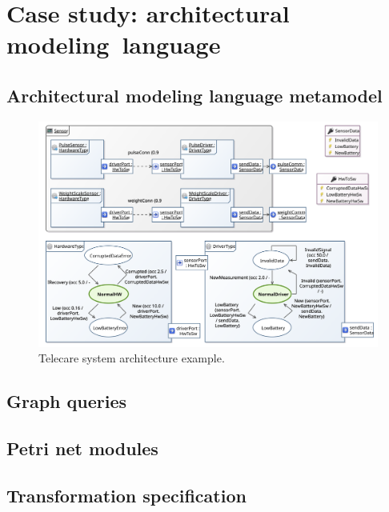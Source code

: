 \chapter{Case study: architectural modeling~language}
\label{app:architecture}

\section{Architectural modeling language metamodel}

\begin{figure}
  \centering
  \includegraphics[width=\textwidth]{figures/telecare_system}
  \caption{Telecare system architecture example.}
  \label{fig:architecture:telecare}
\end{figure}

\section{Graph queries}



\section{Petri net modules}



\section{Transformation specification}

